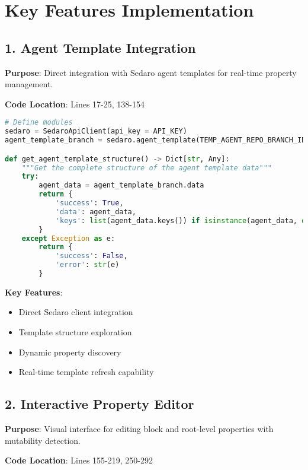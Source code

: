 \documentclass[12pt,a4paper]{article}
\begin{document}
\section{Key Features Implementation}

\subsection{1. Agent Template Integration}

\textbf{Purpose}: Direct integration with Sedaro agent templates for real-time property management.

\textbf{Code Location}: Lines 17-25, 138-154

\begin{lstlisting}[language=Python, caption=Agent Template Initialization]
# Define modules
sedaro = SedaroApiClient(api_key = API_KEY)
agent_template_branch = sedaro.agent_template(TEMP_AGENT_REPO_BRANCH_ID)

def get_agent_template_structure() -> Dict[str, Any]:
    """Get the complete structure of the agent template data"""
    try:
        agent_data = agent_template_branch.data
        return {
            'success': True,
            'data': agent_data,
            'keys': list(agent_data.keys()) if isinstance(agent_data, dict) else []
        }
    except Exception as e:
        return {
            'success': False,
            'error': str(e)
        }
\end{lstlisting}

\textbf{Key Features}:
\begin{itemize}
    \item Direct Sedaro client integration
    \item Template structure exploration
    \item Dynamic property discovery
    \item Real-time template refresh capability
\end{itemize}

\subsection{2. Interactive Property Editor}

\textbf{Purpose}: Visual interface for editing block and root-level properties with mutability detection.

\textbf{Code Location}: Lines 155-219, 250-292
\end{document}
